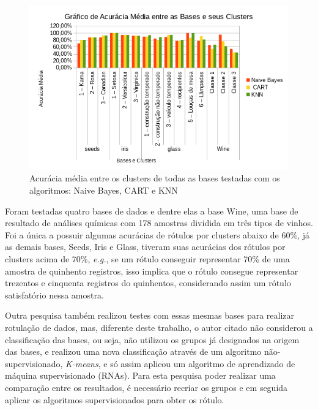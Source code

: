 \begin{figure}[h!]
        \centering
        \includegraphics[scale=0.9]{figs/grafico_acuracia_media_algoritmos.png}
        \caption{Acurácia média entre os clusters de todas as bases testadas com os algoritmos: Naive Bayes, CART e KNN} \label{fig:acuracia_media_algoritmos}
\end{figure}

Foram testadas quatro bases de dados e dentre elas a base Wine, uma base de resultado de análises químicas com 178 amostras dividida em três tipos de vinhos. Foi a única a possuir algumas acurácias de rótulos por clusters abaixo de 60\%, já as demais bases, Seeds, Iris e Glass, tiveram suas acurácias dos rótulos por clusters acima de 70\%, \textit{e.g.}, se um rótulo conseguir representar 70\% de uma amostra de quinhento registros, isso implica que o rótulo consegue representar trezentos e cinquenta registros do quinhentos, considerando assim um rótulo satisfatório nessa amostra.




Outra pesquisa \cite{Lopes2016} também realizou testes com essas mesmas bases para realizar rotulação de dados, mas, diferente deste trabalho, o autor citado não considerou a classificação das bases, ou seja,  não utilizou os grupos já designados na origem das bases, e realizou  uma nova classificação através de um algoritmo não-supervisionado,\textit{ K-means}, e só assim aplicou um algoritmo de aprendizado  de máquina supervisionado (RNAs). Para esta pesquisa poder realizar uma comparação entre os resultados, é necessário recriar os grupos e em seguida aplicar os algoritmos supervisionados para obter os rótulo. 


